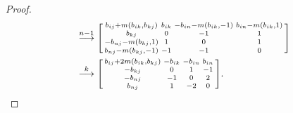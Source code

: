 \documentclass{amsart}
\theoremstyle{definition}
\theoremstyle{remark}
\numberwithin{equation}{section}
\newcommand{\0}{{\mathbf{0}}}
\begin{document}
\begin{proof}
\begin{align*}
&\overset{n-1}{\longrightarrow}
\begin{bsmallmatrix*}
b_{ij}+m(b_{ik},b_{kj}) & b_{ik} & -b_{in}-m(b_{ik},-1) & b_{in}-m(b_{ik},1)\\
b_{kj}& 0 & -1 & 1\\
-b_{nj}-m(b_{kj},1)& 1 & 0 & 1\\
b_{nj}-m(b_{kj},-1) & -1 & -1 & 0
\end{bsmallmatrix*}\\
&\overset{k}{\longrightarrow}
\begin{bsmallmatrix*}
b_{ij}+2m(b_{ik},b_{kj}) & -b_{ik} & -b_{in} & b_{in}\\
-b_{kj} & 0 & 1 & -1\\
-b_{nj} & -1 & 0 & 2\\
b_{nj} & 1 & -2 & 0
\end{bsmallmatrix*}.
\end{align*}


\end{proof}
\end{document}
